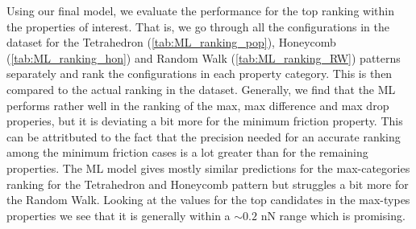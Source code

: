 Using our final model, we evaluate the performance for the top ranking within
the properties of interest. That is, we go through all the configurations in the
dataset for the Tetrahedron (\cref{tab:ML_ranking_pop}), Honeycomb
(\cref{tab:ML_ranking_hon}) and Random Walk (\cref{tab:ML_ranking_RW}) patterns
separately and rank the configurations in each property category. This is then
compared to the actual ranking in the dataset. Generally, we find that the
\acrshort{ML} performs rather well in the ranking of the max, max difference and
max drop properies, but it is deviating a bit more for the minimum friction
property. This can be attritbuted to the fact that the precision needed for an
accurate ranking among the minimum friction cases is a lot greater than for the
remaining properties. The \acrshort{ML} model gives mostly similar predictions
for the max-categories ranking for the Tetrahedron and Honeycomb pattern but
struggles a bit more for the Random Walk. Looking at the values for the top
candidates in the max-types properties we see that it is generally within a
$\sim 0.2$ nN range which is promising. 

